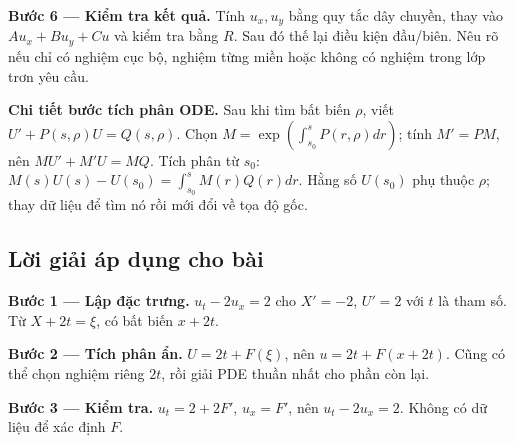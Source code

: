 \documentclass[10pt,a4paper]{article}
\begin{document}
\textbf{Bước 6 — Kiểm tra kết quả.} Tính $u_x,u_y$ bằng quy tắc dây chuyền, thay vào $Au_x+Bu_y+Cu$ và kiểm tra bằng $R$. Sau đó thế lại điều kiện đầu/biên. Nêu rõ nếu chỉ có nghiệm cục bộ, nghiệm từng miền hoặc không có nghiệm trong lớp trơn yêu cầu.

\textbf{Chi tiết bước tích phân ODE.} Sau khi tìm bất biến $\rho$, viết $U'+P(s,\rho)U=Q(s,\rho)$. Chọn $M=\exp(\int_{s_0}^{s}P(r,\rho)dr)$; tính $M'=PM$, nên $MU'+M'U=MQ$. Tích phân từ $s_0$: $M(s)U(s)-U(s_0)=\int_{s_0}^sM(r)Q(r)dr$. Hằng số $U(s_0)$ phụ thuộc $\rho$; thay dữ liệu để tìm nó rồi mới đổi về tọa độ gốc.
\subsection*{Lời giải áp dụng cho bài}
\textbf{Bước 1 — Lập đặc trưng.} $u_t-2u_x=2$ cho $X'=-2$, $U'=2$ với $t$ là tham số. Từ $X+2t=\xi$, có bất biến $x+2t$.

\textbf{Bước 2 — Tích phân ẩn.} $U=2t+F(\xi)$, nên $u=2t+F(x+2t)$. Cũng có thể chọn nghiệm riêng $2t$, rồi giải PDE thuần nhất cho phần còn lại.

\textbf{Bước 3 — Kiểm tra.} $u_t=2+2F'$, $u_x=F'$, nên $u_t-2u_x=2$. Không có dữ liệu để xác định $F$.
\end{document}
